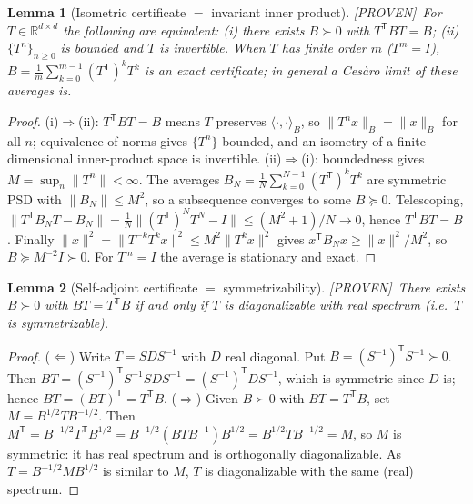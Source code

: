 \documentclass[11pt]{article}
\theoremstyle{definition}
\theoremstyle{plain}
\newtheorem{lemma}{Lemma}
\theoremstyle{remark}
\newcommand{\PROVEN}{\textcolor{green!45!black}{\textsf{[PROVEN]}}}
\newcommand{\T}{\mathsf{T}}
\newcommand{\trp}{^{\!\T}}
\begin{document}
\begin{lemma}[Isometric certificate $=$ invariant inner product]\label{lem:iso}
\PROVEN\ For $T\in\mathbb R^{d\times d}$ the following are equivalent: (i) there exists
$B\succ0$ with $T\trp BT=B$; (ii) $\{T^n\}_{n\ge0}$ is bounded and $T$ is invertible.
When $T$ has finite order $m$ ($T^m=I$), $B=\tfrac1m\sum_{k=0}^{m-1}(T\trp)^kT^k$ is an
exact certificate; in general a Ces\`aro limit of these averages is.
\end{lemma}
\begin{proof}
(i)$\Rightarrow$(ii): $T\trp BT=B$ means $T$ preserves $\langle\cdot,\cdot\rangle_B$, so
$\|T^nx\|_B=\|x\|_B$ for all $n$; equivalence of norms gives $\{T^n\}$ bounded, and an
isometry of a finite-dimensional inner-product space is invertible.
(ii)$\Rightarrow$(i): boundedness gives $M=\sup_n\|T^n\|<\infty$. The averages
$B_N=\tfrac1N\sum_{k=0}^{N-1}(T\trp)^kT^k$ are symmetric PSD with $\|B_N\|\le M^2$, so a
subsequence converges to some $B\succeq0$. Telescoping,
$\|T\trp B_NT-B_N\|=\tfrac1N\|(T\trp)^NT^N-I\|\le (M^2+1)/N\to0$, hence $T\trp BT=B$.
Finally $\|x\|^2=\|T^{-k}T^kx\|^2\le M^2\|T^kx\|^2$ gives $x\trp B_Nx\ge\|x\|^2/M^2$, so
$B\succeq M^{-2}I\succ0$. For $T^m=I$ the average is stationary and exact.
\end{proof}

\begin{lemma}[Self-adjoint certificate $=$ symmetrizability]\label{lem:sa}
\PROVEN\ There exists $B\succ0$ with $BT=T\trp B$ \emph{if and only if} $T$ is
diagonalizable with real spectrum (i.e.\ $T$ is symmetrizable).
\end{lemma}
\begin{proof}
($\Leftarrow$) Write $T=SDS^{-1}$ with $D$ real diagonal. Put $B=(S^{-1})\trp S^{-1}\succ0$.
Then $BT=(S^{-1})\trp S^{-1}SDS^{-1}=(S^{-1})\trp D S^{-1}$, which is symmetric since $D$
is; hence $BT=(BT)\trp=T\trp B$.
($\Rightarrow$) Given $B\succ0$ with $BT=T\trp B$, set $M=B^{1/2}TB^{-1/2}$. Then
$M\trp=B^{-1/2}T\trp B^{1/2}=B^{-1/2}(BTB^{-1})B^{1/2}=B^{1/2}TB^{-1/2}=M$, so $M$ is
symmetric: it has real spectrum and is orthogonally diagonalizable. As $T=B^{-1/2}MB^{1/2}$
is similar to $M$, $T$ is diagonalizable with the same (real) spectrum.
\end{proof}
\end{document}
